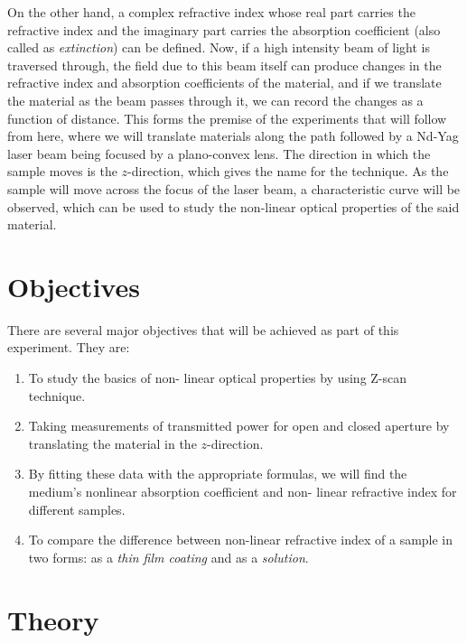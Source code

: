 \documentclass[%
 reprint,
 amsmath,amssymb,
 aps,
]{revtex4-2}
\begin{document}
	\par
	On the other hand, a complex refractive index whose real part carries the refractive index and the imaginary part carries the absorption coefficient (also called as \textit{extinction}) can be defined. Now, if a high intensity beam of light is traversed through, the field due to this beam itself can produce changes in the refractive index and absorption coefficients of the material, and if we translate the material as the beam passes through it, we can record the changes as a function of distance. This forms the premise of the experiments that will follow from here, where we will translate materials along the path followed by a Nd-Yag laser beam being focused by a plano-convex lens. The direction in which the sample moves is the $ z $-direction, which gives the name for the technique. As the sample will move across the focus of the laser beam, a characteristic curve will be observed, which can be used to study the non-linear optical properties of the said material.
	



\section{Objectives}
	There are several major objectives that will be achieved as part of this experiment. They are:
	\begin{enumerate}
		\item To study the basics of non-
		linear optical properties by
		using Z-scan technique.
		\item Taking measurements of transmitted power for open and
		closed aperture by translating
		the material in the $ z $-direction.
		\item By fitting these data with the
		appropriate formulas, we will
		find the medium's nonlinear
		absorption coefficient and non-
		linear refractive index for different samples.
		\item To compare the difference between non-linear refractive index of a sample in two forms: as a \textit{thin film coating} and as a \textit{solution}. 
	\end{enumerate}


\section{Theory}
	
\end{document}
